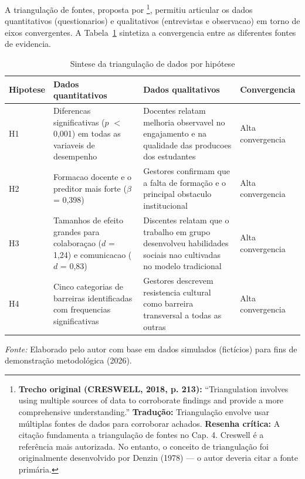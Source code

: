 A triangulação de fontes, proposta por \cite{CRESWELL2018}\footnote{\textbf{Trecho original (CRESWELL, 2018, p. 213):} ``Triangulation involves using multiple sources of data to corroborate findings and provide a more comprehensive understanding.'' \textbf{Tradução:} Triangulação envolve usar múltiplas fontes de dados para corroborar achados. \textbf{Resenha crítica:} A citação fundamenta a triangulação de fontes no Cap. 4. Creswell é a referência mais autorizada. No entanto, o conceito de triangulação foi originalmente desenvolvido por Denzin (1978) — o autor deveria citar a fonte primária.}, permitiu articular os dados quantitativos (questionarios) e qualitativos (entrevistas e observacao) em torno de eixos convergentes. A Tabela~\ref{tab:triangulação} sintetiza a convergencia entre as diferentes fontes de evidencia.

\begin{table}[htbp]
    \centering
    \caption{Sintese da triangulação de dados por hipótese}
    \label{tab:triangulação}
    \small
    \begin{tabular}{p{}p{4cm}p{4cm}p{3cm}}
        \toprule
        \textbf{Hipotese} & \textbf{Dados quantitativos} & \textbf{Dados qualitativos} & \textbf{Convergencia} \\
        \midrule
        H1 & Diferencas significativas ($p$ $<$ 0,001) em todas as variaveis de desempenho & Docentes relatam melhoria observavel no engajamento e na qualidade das producoes dos estudantes & Alta convergencia \\
        \addlinespace
        H2 & Formacao docente e o preditor mais forte ($\beta$ = 0,398) & Gestores confirmam que a falta de formação e o principal obstaculo institucional & Alta convergencia \\
        \addlinespace
        H3 & Tamanhos de efeito grandes para colaboraçao ($d$ = 1,24) e comunicacao ($d$ = 0,83) & Discentes relatam que o trabalho em grupo desenvolveu habilidades sociais nao cultivadas no modelo tradicional & Alta convergencia \\
        \addlinespace
        H4 & Cinco categorias de barreiras identificadas com frequencias significativas & Gestores descrevem resistencia cultural como barreira transversal a todas as outras & Alta convergencia \\
        \bottomrule
    \end{tabular}
    \par\medskip
    \footnotesize{\textit{Fonte:} Elaborado pelo autor com base em dados simulados (fictícios) para fins de demonstração metodológica (2026).}
\end{table}

